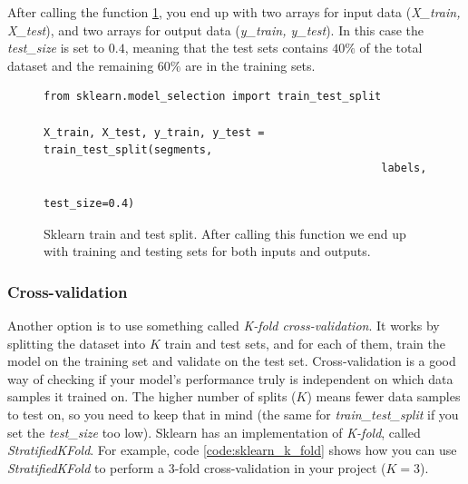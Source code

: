After calling the function \ref{code:sklearn_train_test_split}, you end up with two arrays for input data (\textit{X\_train, X\_test}), and two arrays for output data (\textit{y\_train, y\_test}). In this case the \textit{test\_size} is set to $0.4$, meaning that the test sets contains $40\%$ of the total dataset and the remaining $60\%$ are in the training sets.

\begin{figure}
\begin{code}
    \begin{verbatim}
from sklearn.model_selection import train_test_split

X_train, X_test, y_train, y_test = train_test_split(segments, 
                                                    labels, 
                                                    test_size=0.4)
    \end{verbatim}
    \caption{Sklearn train and test split. After calling this function we end up with training and testing sets for both inputs and outputs.}
    \label{code:sklearn_train_test_split}
\end{code}
\end{figure}

\subsubsection{Cross-validation}
Another option is to use something called \textit{K-fold cross-validation}. It works by splitting the dataset into $K$ train and test sets, and for each of them, train the model on the training set and validate on the test set. Cross-validation is a good way of checking if your model's performance truly is independent on which data samples it trained on. The higher number of splits ($K$) means fewer data samples to test on, so you need to keep that in mind (the same for \textit{train\_test\_split} if you set the \textit{test\_size} too low). Sklearn has an implementation of \textit{K-fold}, called \textit{StratifiedKFold}. For example, code \ref{code:sklearn_k_fold} shows how you can use \textit{StratifiedKFold} to perform a 3-fold cross-validation in your project ($K = 3$). 

\newpage


